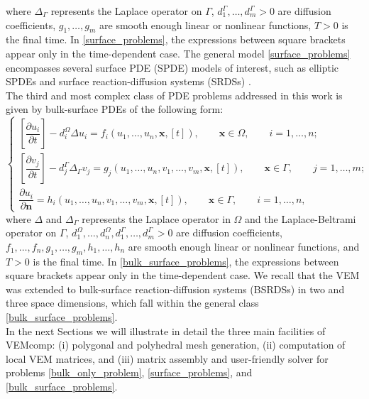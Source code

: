 \documentclass[a4paper]{article}
\newcommand{\boldn}{\boldsymbol{n}}
\newcommand{\boldx}{\boldsymbol{x}}
\begin{document}
{\begin{equation}
\end{equation}
where $\Delta_\Gamma$ represents the Laplace operator on $\Gamma$, $d_1^\Gamma,\dots, d_m^\Gamma > 0$ are diffusion coefficients,  $g_1, \dots, g_m$ are smooth enough linear or nonlinear functions, $T>0$ is the final time. In \eqref{surface_problems}, the expressions between square brackets appear only in the time-dependent case. The general model \eqref{surface_problems} encompasses several surface PDE (SPDE) models of interest, such as elliptic SPDEs \cite{bachini2021arbitrary, frittelli2018virtual} and surface reaction-diffusion systems (SRDSs) \cite{lacitignola2017turing, lacitignola2022pattern}.\\
The third and most complex class of PDE problems addressed in this work is given by bulk-surface PDEs of the following form:
\begin{equation}
\label{bulk_surface_problems}
\begin{cases}
\left[\dfrac{\partial u_i}{\partial t}\right] - d_i^\Omega \Delta u_i = f_i(u_1,\dots,u_n, \boldx, [t]),  \qquad \boldx \in\Omega,\qquad i=1,\dots, n;\\
\left[\dfrac{\partial v_j}{\partial t}\right] - d_j^\Gamma \Delta_\Gamma v_j = g_j(u_1,\dots,u_n, v_1,\dots, v_m,\boldx, [t]), \qquad \boldx \in \Gamma,\qquad j=1,\dots,m;\\
\dfrac{\partial u_i}{\partial \boldn} = h_i(u_1,\dots,u_n,v_1,\dots,v_m,\boldx, [t]), \qquad \boldx \in \Gamma,\qquad i=1,\dots,n,
\end{cases}
\end{equation}
where $\Delta$ and $\Delta_\Gamma$ represents the Laplace operator in $\Omega$ and the Laplace-Beltrami operator on $\Gamma$, $d_1^\Omega,\dots, d_n^\Omega,  d_1^\Gamma,\dots, d_m^\Gamma > 0$ are diffusion coefficients,  $f_1, \dots, f_n, g_1,\dots,g_m,h_1,\dots,h_n$ are smooth enough linear or nonlinear functions, and $T>0$ is the final time.  In \eqref{bulk_surface_problems}, the expressions between square brackets appear only in the time-dependent case.  We recall that the VEM was extended to bulk-surface reaction-diffusion systems (BSRDSs) in two \cite{frittelli2021bulk} and three \cite{frittelli2023bsrds} space dimensions, which fall within the general class \eqref{bulk_surface_problems}. \\
In the next Sections we will illustrate in detail the three main facilities of VEMcomp: (i) polygonal and polyhedral mesh generation, (ii) computation of local VEM matrices, and (iii)  matrix assembly and user-friendly solver for problems \eqref{bulk_only_problem}, \eqref{surface_problems}, and \eqref{bulk_surface_problems}.}
\end{document}
